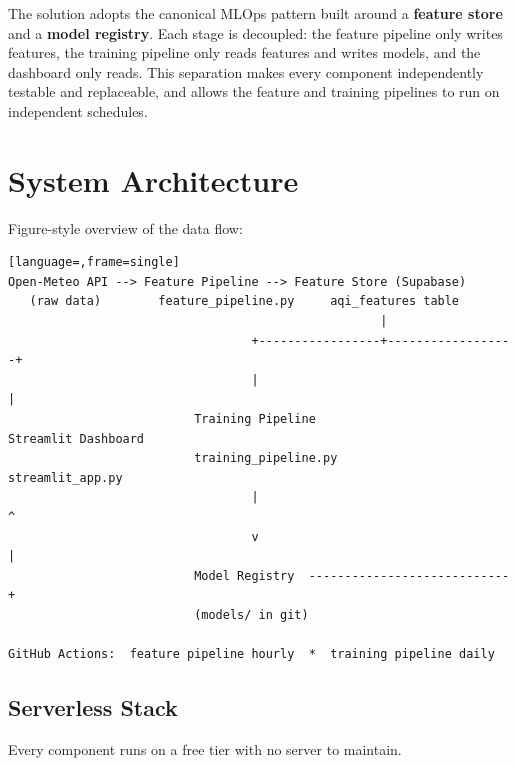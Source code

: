\documentclass[11pt,a4paper]{article}
\begin{document}
The solution adopts the canonical MLOps pattern built around a
\textbf{feature store} and a \textbf{model registry}. Each stage is decoupled:
the feature pipeline only writes features, the training pipeline only reads
features and writes models, and the dashboard only reads. This separation makes
every component independently testable and replaceable, and allows the feature
and training pipelines to run on independent schedules.

\section{System Architecture}
Figure-style overview of the data flow:

\begin{center}
\begin{lstlisting}[language=,frame=single]
Open-Meteo API --> Feature Pipeline --> Feature Store (Supabase)
   (raw data)        feature_pipeline.py     aqi_features table
                                                    |
                                  +-----------------+------------------+
                                  |                                    |
                          Training Pipeline                    Streamlit Dashboard
                          training_pipeline.py                  streamlit_app.py
                                  |                                    ^
                                  v                                    |
                          Model Registry  ----------------------------+
                          (models/ in git)

GitHub Actions:  feature pipeline hourly  *  training pipeline daily
\end{lstlisting}
\end{center}

\subsection{Serverless Stack}
Every component runs on a free tier with no server to maintain.
\end{document}
